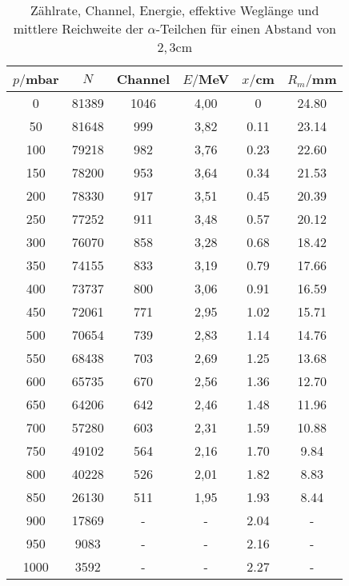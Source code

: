\begin{table}[H]
  \centering
  \caption{Zählrate, Channel, Energie, effektive Weglänge und mittlere Reichweite der $\alpha$-Teilchen für einen Abstand von $2,3$cm}
  \label{tab:Spannungsamplitude}
  \begin{tabular}{c c c c c c}
    \toprule
    $p/$mbar & $N$ & Channel & $E/$MeV & $x/$cm& $R_m/$mm \\
    \midrule
    0	  & 81389  &1046 &  4,00& 0     & 24.80         \\
    50	& 81648  & 999 &  3,82& 0.11  & 23.14        \\
    100 & 79218  & 982 &  3,76& 0.23  & 22.60        \\
    150 & 78200  & 953 &  3,64& 0.34  & 21.53        \\
    200 & 78330  & 917 &  3,51& 0.45  & 20.39        \\
    250 & 77252  & 911 &  3,48& 0.57  & 20.12        \\
    300 & 76070  & 858 &  3,28& 0.68  & 18.42        \\
    350 & 74155  & 833 &  3,19& 0.79  & 17.66        \\
    400 & 73737  & 800 &  3,06& 0.91  & 16.59        \\
    450 & 72061  & 771 &  2,95& 1.02  & 15.71        \\
    500 & 70654  & 739 &  2,83& 1.14  & 14.76        \\
    550 & 68438  & 703 &  2,69& 1.25  & 13.68        \\
    600 & 65735  & 670 &  2,56& 1.36  & 12.70        \\
    650 & 64206  & 642 &  2,46& 1.48  & 11.96        \\
    700 & 57280  & 603 &  2,31& 1.59  & 10.88        \\
    750 & 49102  & 564 &  2,16& 1.70  & 9.84        \\
    800 & 40228  & 526 &  2,01& 1.82  & 8.83        \\
    850 & 26130  & 511 &  1,95& 1.93  & 8.44        \\
    900 & 17869  &  -  & -    & 2.04  & -        \\
    950 & 9083	 &  -  & -    & 2.16  & -        \\
    1000& 3592   &  -  & -    & 2.27  & -        \\
    \bottomrule
  \end{tabular}
\end{table}





